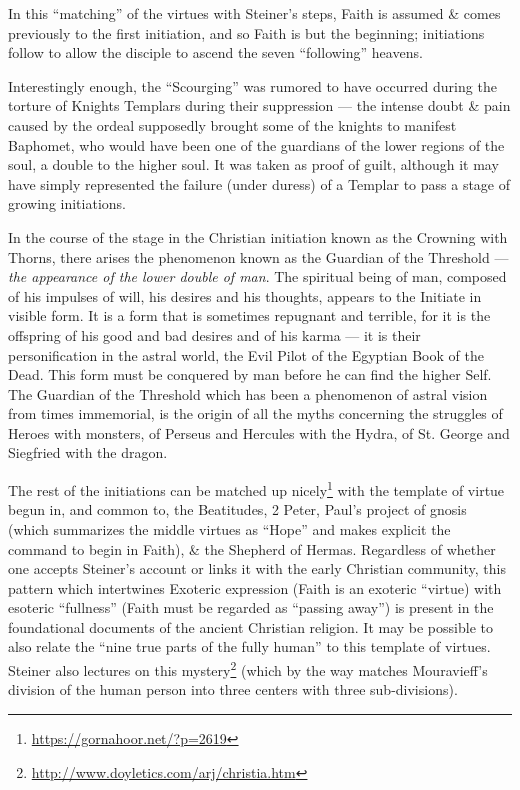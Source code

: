 In this ``matching'' of the virtues with Steiner's steps, Faith is assumed \& comes previously to the first initiation, and so Faith is but the beginning; initiations follow to allow the disciple to ascend the seven ``following'' heavens.

Interestingly enough, the ``Scourging'' was rumored to have occurred during the torture of Knights Templars during their suppression --- the intense doubt \& pain caused by the ordeal supposedly brought some of the knights to manifest Baphomet, who would have been one of the guardians of the lower regions of the soul, a double to the higher soul. It was taken as proof of guilt, although it may have simply represented the failure (under duress) of a Templar to pass a stage of growing initiations.

\begin{quotex}
In the course of the stage in the Christian initiation known as the Crowning with Thorns, there arises the phenomenon known as the Guardian of the Threshold --- \emph{the appearance of the lower double of man}. The spiritual being of man, composed of his impulses of will, his desires and his thoughts, appears to the Initiate in visible form. It is a form that is sometimes repugnant and terrible, for it is the offspring of his good and bad desires and of his karma --- it is their personification in the astral world, the Evil Pilot of the Egyptian Book of the Dead. This form must be conquered by man before he can find the higher Self. The Guardian of the Threshold which has been a phenomenon of astral vision from times immemorial, is the origin of all the myths concerning the struggles of Heroes with monsters, of Perseus and Hercules with the Hydra, of St. George and Siegfried with the dragon.
\end{quotex}


The rest of the initiations can be matched up nicely\footnote{\url{https://gornahoor.net/?p=2619}} with the template of virtue begun in, and common to, the Beatitudes, 2 Peter, Paul's project of gnosis (which summarizes the middle virtues as ``Hope'' and makes explicit the command to begin in Faith), \& the Shepherd of Hermas. Regardless of whether one accepts Steiner's account or links it with the early Christian community, this pattern which intertwines Exoteric expression (Faith is an exoteric ``virtue) with esoteric ``fullness'' (Faith must be regarded as ``passing away'') is present in the foundational documents of the ancient Christian religion. It may be possible to also relate the ``nine true parts of the fully human'' to this template of virtues. Steiner also lectures on this mystery\footnote{\url{http://www.doyletics.com/arj/christia.htm}} (which by the way matches Mouravieff's division of the human person into three centers with three sub-divisions).

